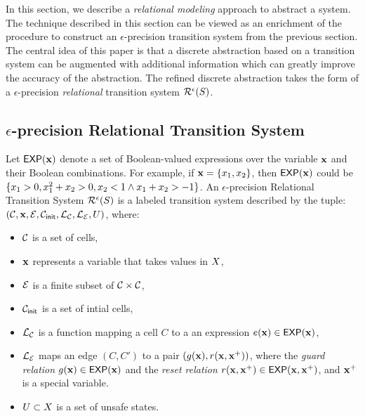 In this section, we describe a {\em relational modeling} approach to
abstract a system. The technique described in this section can be
viewed as an enrichment of the procedure to construct an
$\epsilon$-precision transition system from the previous section.  The
central idea of this paper is that a discrete abstraction based on a
transition system can be augmented with additional information which
can greatly improve the accuracy of the abstraction. The refined
discrete abstraction takes the form of a $\epsilon$-precision {\em
relational} transition system $\mathcal{R}^{\epsilon}(S)$.

\subsection{$\epsilon$-precision Relational Transition System}

Let $\mathsf{EXP}(\mathbf{x})$ denote a set of Boolean-valued expressions over the
variable $\mathbf{x}$ and their Boolean combinations.  For example, if $\mathbf{x} =
\{x_1,x_2\}$, then $\mathsf{EXP}(\mathbf{x})$ could be $\{ x_1 > 0, x^2_1
+ x_2 > 0, x_2 < 1 \wedge x_1 + x_2 > -1\}$.  An $\epsilon$-precision
Relational Transition System $\mathcal{R}^{\epsilon}(S)$ is a
labeled transition system described by the tuple:
$(\mathcal{C},\mathbf{x},\mathcal{E},\mathcal{C}_{\mathsf{init}},\mathcal{L}_\mathcal{C},
\mathcal{L}_\mathcal{E},U)$, where:

\begin{itemize}[label=--,leftmargin=1em,labelsep=*]
\item
$\mathcal{C}$ is a set of cells,
\item
$\mathbf{x}$ represents a variable that takes values in $X$, 
\item
$\mathcal{E}$ is a finite subset of $\mathcal{C} \times \mathcal{C}$, 
\item
$\mathcal{C}_{\mathsf{init}}$ is a set of intial cells, 
\item
$\mathcal{L}_\mathcal{C}$ is a function mapping a cell $C$ to a
an expression $e(\mathbf{x}) \in \mathsf{EXP}(\mathbf{x})$,
\item
$\mathcal{L}_\mathcal{E}$ maps an edge $(C,C')$ to a pair $(g(\mathbf{x}),
r(\mathbf{x},\mathbf{x}^{+}))$, where the {\em guard relation} $g(\mathbf{x}) \in \mathsf{EXP}(\mathbf{x})$
and the {\em reset relation} $r(\mathbf{x},\mathbf{x}^{+}) \in \mathsf{EXP}(\mathbf{x},\mathbf{x}^{+})$, and
$\mathbf{x}^{+}$ is a special variable.
\item
$U \subset X$ is a set of unsafe states.
\end{itemize}



